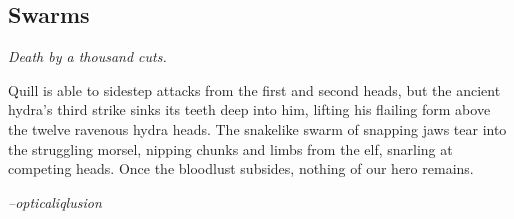 \subsection{Swarms}
\textit{Death by a thousand cuts.}

\begin{quotebox}
Quill is able to sidestep attacks from the first and second heads, but the ancient hydra's third strike sinks its teeth deep into him, lifting his flailing form above the twelve ravenous hydra heads. The snakelike swarm of snapping jaws tear into the struggling morsel, nipping chunks and limbs from the elf, snarling at competing heads. Once the bloodlust subsides, nothing of our hero remains.

\textit{--opticaliqlusion}
\end{quotebox}